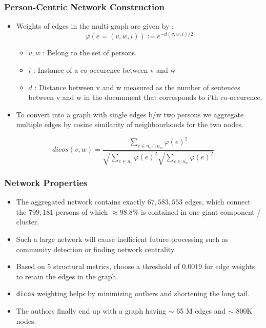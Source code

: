 \documentclass[9pt, compress]{beamer}
\begin{document}
\begin{frame}[fragile]
	\frametitle{Person-Centric Network Construction}
\begin{itemize}
\item Weights of edges in the multi-graph are given by : 
\begin{equation} \varphi(e = (v, w, i)) := e^{-d(v,w,i)/2} \end{equation}
\begin{itemize}
\item \(v,w\) : Belong to the set of persons.
\item \(i\) : Instance of a co-occurence between v and w 
\item \(d\) : Distance between v and w measured as the number of sentences between v and w in the documment that corresponds to i'th co-occurence.
\end{itemize}
\item To convert into a graph with single edges b/w two persons we aggregate multiple edges by cosine similarity of neighbourhoods for the two nodes.
\end{itemize}
\begin{equation}
dicos(v,w) = \frac{\sum_{e\in n_v \cap n_w} \varphi(e)^2}{\sqrt{\sum_{e\in n_v} \varphi(e)^2}\sqrt{\sum_{e\in n_w} \varphi(e)^2}}
\end{equation}
\end{frame}

\begin{frame}[fragile]
	\frametitle{Network Properties}
\begin{itemize}
\item The aggregated network contains exactly \(67, 583, 553\) edges, which connect the \(799, 181\) persons of which \(\approx 98.8\%\) is contained in one giant component / cluster.
\item Such a large network will cause inefficient future-processing such as community detection or finding network centrality.
\item Based on 5 structural metrics, choose a threshold of 0.0019 for edge weights to retain the edges in the graph.
\item \texttt{dicos} weighting helps by minimizing outliers and shortening the long tail.
\item The authors finally end up with a graph having $\sim$ 65 M edges and $\sim$ 800K nodes.
\end{itemize}
\end{frame}
\end{document}
